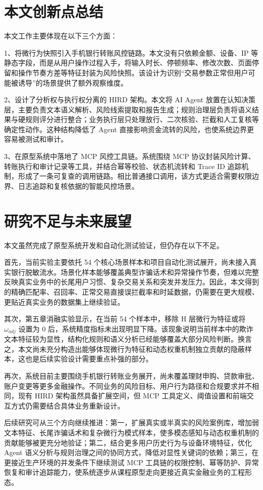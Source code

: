 \documentclass{xduugthesis}
\begin{document}
\section{本文创新点总结}

本文工作主要体现在以下三个方面：

1、将微行为快照引入手机银行转账风控链路。本文没有只依赖金额、设备、IP 等静态字段，而是从用户操作过程入手，将输入时长、停顿频率、修改次数、页面停留和操作节奏方差等特征封装为风险快照。该设计为识别“交易参数正常但用户可能被诱导”的场景提供了额外观察维度。

2、设计了分析权与执行权分离的 HIRD 架构。本文将 AI Agent 放置在认知决策层，主要负责文本语义解析、风险线索提取和报告生成；规则治理层负责将语义结果与硬规则评分进行整合；业务执行层只处理放行、二次核验、拦截和人工复核等确定性动作。这种结构降低了 Agent 直接影响资金流转的风险，也使系统边界更容易被测试和审计。

3、在原型系统中落地了 MCP 风控工具链。系统围绕 MCP 协议封装风险计算、转账执行和审计记录等工具，并结合幂等校验、状态机流转和 Trace ID 追踪机制，形成了一条可复查的调用链路。相比普通接口调用，该方式更适合需要权限边界、日志追踪和复核依据的智能风控场景。

\section{研究不足与未来展望}

本文虽然完成了原型系统开发和自动化测试验证，但仍存在以下不足。

首先，当前实验主要依托 54 个核心场景样本和项目自动化测试展开，尚未接入真实银行脱敏流水。场景化样本能够覆盖典型诈骗话术和异常操作节奏，但难以完整反映真实业务中的长尾用户习惯、复杂交易关系和突发并发压力。因此，本文得到的精确匹配率、召回率、正常交易直接误拦截率和时延数据，仍需要在更大规模、更贴近真实业务的数据集上继续验证。

其次，第五章消融实验显示，在当前 54 个样本中，移除 H 层微行为特征或将 $\omega_{adj}$ 设置为 0 后，系统精度指标未出现明显下降。该现象说明当前样本中的欺诈文本特征较为显性，结构化规则和语义分析已经能够覆盖大部分风险判断。换言之，本文尚未充分构造出能够体现微行为特征和动态权重机制独立贡献的隐蔽样本，这也是后续实验设计需要重点补强的部分。

再次，系统目前主要围绕手机银行转账业务展开，尚未覆盖理财申购、贷款审批、账户变更等更多金融操作。不同业务的风险目标、用户行为路径和合规要求并不相同，现有 HIRD 架构虽然具备扩展空间，但 MCP 工具定义、阈值设置和前端交互方式仍需要结合具体业务重新设计。

后续研究可从三个方向继续推进：第一，扩展真实或半真实的风险案例库，增加弱文本特征、长尾诈骗话术和复杂微行为模式样本，使多模态感知与动态权重机制的贡献能够被更充分地验证；第二，结合更多用户历史行为与设备环境特征，优化 Agent 语义分析与规则治理之间的协同方式，降低对显性关键词的依赖；第三，在更接近生产环境的并发条件下继续测试 MCP 工具链的权限控制、幂等防护、异常恢复和审计追踪能力，使系统逐步从课程原型走向更接近真实金融业务的工程形态。
\end{document}
